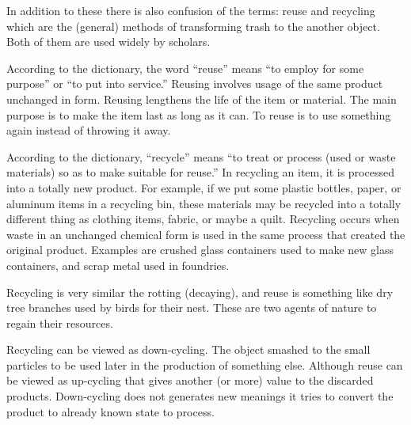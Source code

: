 In addition to these there is also confusion of the terms: reuse and recycling which are the (general) methods of transforming trash to the another object. Both of them are used widely by scholars. 

According to the dictionary, the word “reuse” means “to employ for some purpose” or “to put into service.” Reusing involves usage of the same product unchanged in form. Reusing lengthens the life of the item or material. The main purpose is to make the item last as long as it can. To reuse is to use something again instead of throwing it away. 



According to the dictionary, “recycle” means “to treat or process (used or waste materials) so as to make suitable for reuse.” In recycling an item, it is processed into a totally new product. For example, if we put some plastic bottles, paper, or aluminum items in a recycling bin, these materials may be recycled into a totally different thing as clothing items, fabric, or maybe a quilt. Recycling occurs when waste in an unchanged chemical form is used in the same process that created the original product. Examples are crushed glass containers used to make new glass containers, and scrap metal used in foundries.

Recycling is very similar the rotting (decaying), and reuse is something like dry tree branches used by birds for their nest. These are two agents of nature to regain their resources.

Recycling can be viewed as down-cycling. The object smashed to the small particles to be used later in the production of something else. Although reuse can be viewed as up-cycling that gives another (or more) value to the discarded products. Down-cycling does not generates new meanings it tries to convert the product to already known state to process. 

